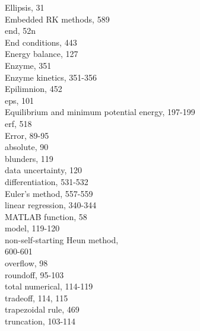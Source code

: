 \documentclass[../main.tex]{subfiles}
\begin{document}
\begin{multicols}{3}
    Ellipsis, 31\\
    Embedded RK methods, 589\\
    end, 52n\\
    End conditions, 443\\
    Energy balance, 127\\
    Enzyme, 351\\
    Enzyme kinetics, 351-356\\
    Epilimnion, 452\\
    eps, 101\\
    Equilibrium and minimum potential energy, 197-199\\
    erf, 518\\
    Error, 89-95\\
    \hspace*{3mm}absolute, 90\\
    \hspace*{3mm}blunders, 119\\
    \hspace*{3mm}data uncertainty, 120\\
    \hspace*{3mm}differentiation, 531-532\\
    \hspace*{3mm}Euler's method, 557-559\\
    \hspace*{3mm}linear regression, 340-344\\
    \hspace*{3mm}MATLAB function, 58\\
    \hspace*{3mm}model, 119-120\\
    \hspace*{3mm}non-self-starting Heun method, \\
    \hspace*{3mm}600-601\\
    \hspace*{3mm}overflow, 98\\
    \hspace*{3mm}roundoff, 95-103\\
    \hspace*{3mm}total numerical, 114-119\\
    \hspace*{3mm}tradeoff, 114, 115\\
    \hspace*{3mm}trapezoidal rule, 469\\
    \hspace*{3mm}truncation, 103-114\\

\end{multicols}
\end{document}
